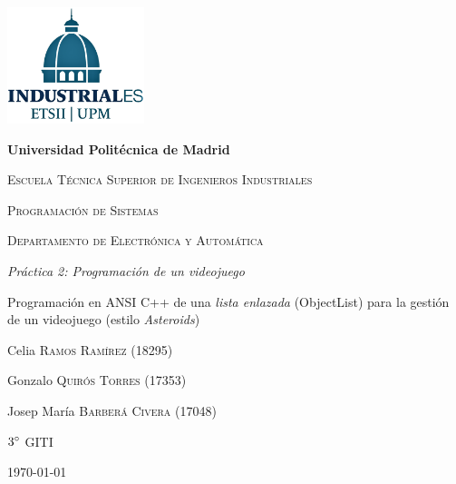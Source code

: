 


	\begin{titlepage}
	\centering
    {\includegraphics[width=0.3\textwidth]{fotos/Logo_azul.png}\par}
	\vspace{1cm}
	{\bfseries\LARGE Universidad Politécnica de Madrid \par}
	\vspace{0.3cm}
	{\scshape\Large Escuela Técnica Superior de Ingenieros Industriales \par}
	\vspace{2.5cm}
	{\scshape\Huge Programación de Sistemas \par}
	\vspace{0.3cm}
	{\scshape\large Departamento de Electrónica y Automática \par}
	\vspace{2cm}
    {\itshape\LARGE Práctica 2: Programación de un videojuego \par}
    \vspace{0.5cm}
    {\upshape\large Programación en ANSI C++ de una \emph{lista enlazada} (ObjectList) para la gestión de un videojuego (estilo \textit{Asteroids})}
	\vfill
	{\large{Celia \textsc{Ramos Ramírez} (18295)\par}}
	\vspace{0.1cm}
    {\large{Gonzalo \textsc{Quirós Torres} (17353)\par}}
	\vspace{0.1cm}
	{\large{Josep María \textsc{Barberá Civera} (17048)\par}}
	\vfill
	{\Large{ $3^{\circ}$ \textsc{GITI}}\par}
	\vfill
	{\Large \today \par}
	\end{titlepage}
	

